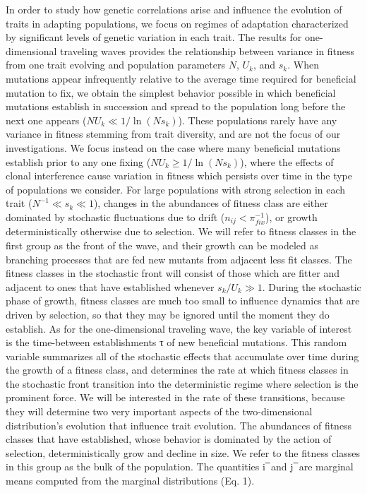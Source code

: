 \documentclass{article}
\begin{document}
In order to study how genetic correlations arise and influence the evolution of traits in adapting populations, we focus on regimes of adaptation characterized by significant levels of genetic variation in each trait. The results for one-dimensional traveling waves provides the relationship between variance in fitness from one trait evolving and population parameters $N$, $U_k$, and $s_k$. When mutations appear infrequently relative to the average time required for beneficial mutation to fix, we obtain the simplest behavior possible in which beneficial mutations establish in succession and spread to the population long before the next one appears ($N U_k \ll 1/\ln(N s_k)$). These populations rarely have any variance in fitness stemming from trait diversity, and are not the focus of our investigations. We focus instead on the case where many beneficial mutations establish prior to any one fixing ($N U_k \geq 1/\ln(N s_k)$), where the effects of clonal interference cause variation in fitness which persists over time in the type of populations we consider. For large populations with strong selection in each trait ($N^{-1}\ll s_k \ll 1$), changes in the abundances of fitness class are either dominated by stochastic fluctuations due to drift ($n_{ij}<\pi_{fix}^{-1}$), or growth deterministically otherwise due to selection. We will refer to fitness classes in the first group as the front of the wave, and their growth can be modeled as branching processes that are fed new mutants from adjacent less fit classes. The fitness classes in the stochastic front will consist of those which are fitter and adjacent to ones that have established whenever $s_k/U_k \gg 1$. During the stochastic phase of growth, fitness classes are much too small to influence dynamics that are driven by selection, so that they may be ignored until the moment they do establish. As for the one-dimensional traveling wave, the key variable of interest is the time-between establishments τ of new beneficial mutations. This random variable summarizes all of the stochastic effects that accumulate over time during the growth of a fitness class, and determines the rate at which fitness classes in the stochastic front transition into the deterministic regime where selection is the prominent force. We will be interested in the rate of these transitions, because they will determine two very important aspects of the two-dimensional distribution’s evolution that influence trait evolution. The abundances of fitness classes that have established, whose behavior is dominated by the action of selection, deterministically grow and decline in size. We refer to the fitness classes in this group as the bulk of the population. The quantities i ̅ and j ̅ are marginal means computed from the marginal distributions (Eq. 1).
\end{document}
